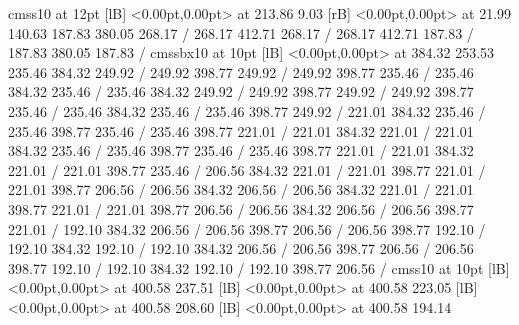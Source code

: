 {\font\picfont cmss10 at 12pt\picfont
{}  [lB] <0.00pt,0.00pt> at 213.86 9.03
 [rB] <0.00pt,0.00pt> at 21.99 140.63
\setsolid
{} 187.83 380.05 268.17 /
 268.17 412.71 268.17 /
 268.17 412.71 187.83 /
 187.83 380.05 187.83 /
\font\picfont cmssbx10 at 10pt\picfont
{}  [lB] <0.00pt,0.00pt> at 384.32 253.53
\setsolid
{} 235.46 384.32 249.92 /
 249.92 398.77 249.92 /
 249.92 398.77 235.46 /
 235.46 384.32 235.46 /
\setsolid
{} 235.46 384.32 249.92 /
 249.92 398.77 249.92 /
 249.92 398.77 235.46 /
 235.46 384.32 235.46 /
\setsolid
{} 235.46 398.77 249.92 /
\setsolid
{} 221.01 384.32 235.46 /
 235.46 398.77 235.46 /
 235.46 398.77 221.01 /
 221.01 384.32 221.01 /
\setsolid
{} 221.01 384.32 235.46 /
 235.46 398.77 235.46 /
 235.46 398.77 221.01 /
 221.01 384.32 221.01 /
\setsolid
{} 221.01 398.77 235.46 /
\setsolid
{} 206.56 384.32 221.01 /
 221.01 398.77 221.01 /
 221.01 398.77 206.56 /
 206.56 384.32 206.56 /
\setsolid
{} 206.56 384.32 221.01 /
 221.01 398.77 221.01 /
 221.01 398.77 206.56 /
 206.56 384.32 206.56 /
\setsolid
{} 206.56 398.77 221.01 /
\setsolid
{} 192.10 384.32 206.56 /
 206.56 398.77 206.56 /
 206.56 398.77 192.10 /
 192.10 384.32 192.10 /
\setsolid
{} 192.10 384.32 206.56 /
 206.56 398.77 206.56 /
 206.56 398.77 192.10 /
 192.10 384.32 192.10 /
\setsolid
{} 192.10 398.77 206.56 /
\font\picfont cmss10 at 10pt\picfont
{}  [lB] <0.00pt,0.00pt> at 400.58 237.51
  [lB] <0.00pt,0.00pt> at 400.58 223.05
  [lB] <0.00pt,0.00pt> at 400.58 208.60
  [lB] <0.00pt,0.00pt> at 400.58 194.14
\endpicture
}
